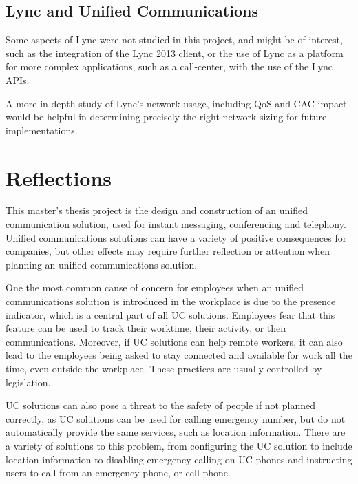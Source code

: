 \subsection{Lync and Unified Communications}
Some aspects of Lync were not studied in this project, and might be of interest, such as the integration of the Lync 2013 client, or the use of Lync as a platform for more complex applications, such as a call-center, with the use of the Lync APIs.

A more in-depth study of Lync's network usage, including QoS and CAC impact would be helpful in determining precisely the right network sizing for future implementations.

\section{Reflections}
This master's thesis project is the design and construction of an unified communication solution, used for instant messaging, conferencing and telephony. Unified communications solutions can have a variety of positive consequences for companies, but other effects may require further reflection or attention when planning an unified communications solution.

One the most common cause of concern for employees when an unified communications solution is introduced in the workplace is due to the presence indicator, which is a central part of all UC solutions. Employees fear that this feature can be used to track their worktime, their activity, or their communications. Moreover, if UC solutions can help remote workers, it can also lead to the employees being asked to stay connected and available for work all the time, even outside the workplace. These practices are usually controlled by legislation.

UC solutions can also pose a threat to the safety of people if not planned correctly, as UC solutions can be used for calling emergency number, but do not automatically provide the same services, such as location information. There are a variety of solutions to this problem, from configuring the UC solution to include location information to disabling emergency calling on UC phones and instructing users to call from an emergency phone, or cell phone.



